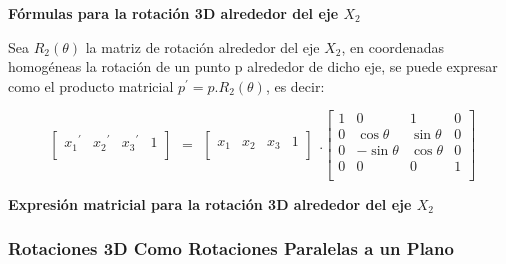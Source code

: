 \begin{center}
\textbf{\footnotesize{Fórmulas para la rotación 3D alrededor del eje $X_{2}$}}
\end{center}

Sea $R_{2}( \theta )$ la matriz de rotación alrededor del eje $X_{2}$, en coordenadas homogéneas la
rotación de un punto p alrededor de dicho eje, se puede expresar como el producto matricial $p^{\prime} = p.R_{2}(\theta)$, es decir:

$$
\begin{array}{rccl}
\left[
\begin{array}{rccl}
{x_{1}}^{\prime} & {x_{2}}^{\prime} & {x_{3}}^{\prime} & 1\\
\end{array}
\right]
\end{array}
=
\begin{array}{rccl}
\left[
\begin{array}{rccl}
x_{1} & x_{2} & x_{3} & 1\\
\end{array}
\right]
\end{array} 
.
\left[
\begin{array}{rccl}
1 & 0 & 1 & 0\\
0 & \cos\theta & \sin\theta &  0\\
0 & -\sin\theta & \cos\theta & 0 \\
0 & 0 & 0 & 1\\
\end{array}
\right]
$$

\begin{center}
\textbf{\footnotesize{Expresión matricial para la rotación 3D alrededor del eje $X_{2}$}}
\end{center}

\subsubsection{Rotaciones 3D Como Rotaciones Paralelas a un Plano}


